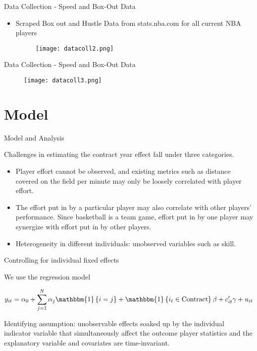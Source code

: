 \documentclass[12pt,aspectratio=916]{beamer} %
\begin{document}
\begin{frame}{Data Collection - Speed and Box-Out Data}
\begin{itemize}
\item Scraped Box out and Hustle Data from stats.nba.com for all current NBA players
\begin{figure}
\centering
\texttt{[image: datacoll2.png]}
\end{figure}
\end{itemize}
\end{frame}

\begin{frame}{Data Collection - Speed and Box-Out Data}
\begin{figure}
\centering
\texttt{[image: datacoll3.png]}
\end{figure}

\end{frame}



\section{Model}

\begin{frame}{Model and Analysis}

Challenges in estimating the contract year effect fall under three categories.

\begin{itemize}
\item Player effort cannot be observed, and existing metrics such as distance covered on the field per minute may only be loosely correlated with player effort.
\item The effort put in by a particular player may also correlate with other players' performance. Since basketball is a team game, effort put in by one player may synergize with effort put in by other players.
\item Heterogeneity in different individuals: unobserved variables such as skill.
\end{itemize}
\end{frame}

\begin{frame}{Controlling for individual fixed effects}

We use the regression model

\[
y_{it} = \alpha_0 + \sum_{j=1}^N \alpha_j \mathbbm{1}\left\lbrace i= j \right\rbrace + \mathbbm{1}\left\lbrace i_t\in \mathrm{Contract} \right\rbrace\beta + c_{it}'\gamma + u_{it}
\]

Identifying assumption: unobservable effects soaked up by the individual indicator variable that simultaneously affect the outcome player statistics and the explanatory variable and covariates are time-invariant.
\end{frame}
\end{document}
